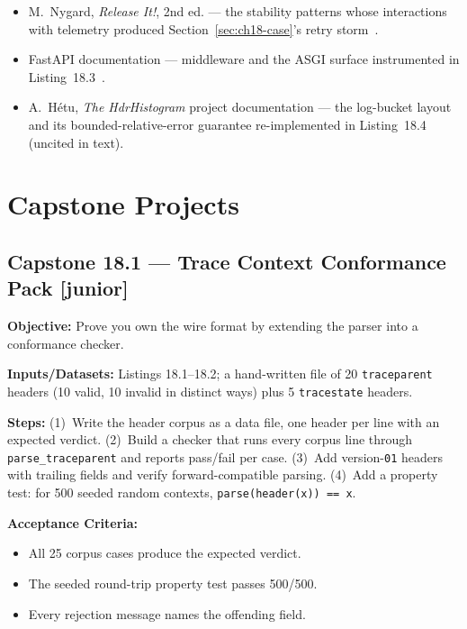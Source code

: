 \begin{itemize}
        messaging and stream-processing background for the
        propagation-through-queues discussion~\cite{kleppmann2017ddia}.
  \item M.~Nygard, \emph{Release It!}, 2nd ed. --- the stability patterns
        whose interactions with telemetry produced
        Section~\ref{sec:ch18-case}'s retry storm~\cite{nygard2018releaseit}.
  \item FastAPI documentation --- middleware and the ASGI surface
        instrumented in Listing~18.3~\cite{fastapidocs}.
  \item A.~H\'{e}tu, \emph{The HdrHistogram} project documentation --- the
        log-bucket layout and its bounded-relative-error guarantee
        re-implemented in Listing~18.4 (uncited in text).
\end{itemize}

\section{Capstone Projects}
\label{sec:ch18-capstones}

\subsection*{Capstone 18.1 --- Trace Context Conformance Pack \hfill [junior]}
\textbf{Objective:} Prove you own the wire format by extending the parser
into a conformance checker.

\textbf{Inputs/Datasets:} Listings 18.1--18.2; a hand-written file of 20
\texttt{traceparent} headers (10 valid, 10 invalid in distinct ways) plus
5 \texttt{tracestate} headers.

\textbf{Steps:} (1)~Write the header corpus as a data file, one header per
line with an expected verdict. (2)~Build a checker that runs every corpus
line through \texttt{parse\_traceparent} and reports pass/fail per case.
(3)~Add version-\texttt{01} headers with trailing fields and verify
forward-compatible parsing. (4)~Add a property test: for 500 seeded random
contexts, \texttt{parse(header(x)) == x}.

\textbf{Acceptance Criteria:}
\begin{itemize}
  \item[$\square$] All 25 corpus cases produce the expected verdict.
  \item[$\square$] The seeded round-trip property test passes 500/500.
  \item[$\square$] Every rejection message names the offending field.
\end{itemize}

